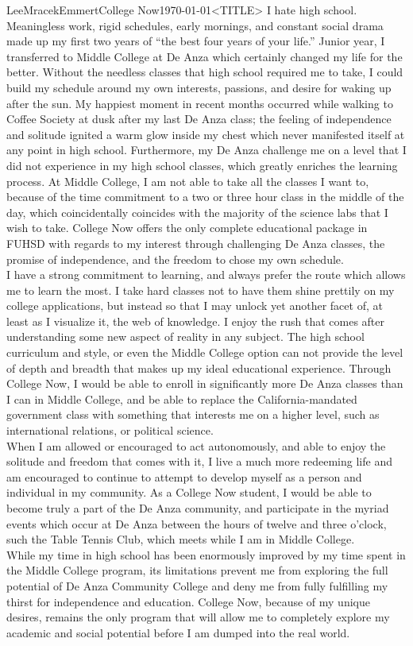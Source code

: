 \documentclass[a4paper]{article}
\begin{document}
\begin{mla}{Lee}{Mracek}{Emmert}{College Now}{\today}{<TITLE>}
    I hate high school. Meaningless work, rigid schedules, early mornings, and constant social drama made up my first two years of ``the best four years of your life.'' Junior year, I transferred to Middle College at De Anza which certainly changed my life for the better. Without the needless classes that high school required me to take, I could build my schedule around my own interests, passions, and desire for waking up after the sun. My happiest moment in recent months occurred while walking to Coffee Society at dusk after my last De Anza class; the feeling of independence and solitude ignited a warm glow inside my chest which never manifested itself at any point in high school. Furthermore, my De Anza challenge me on a level that I did not experience in my high school classes, which greatly enriches the learning process. At Middle College, I am not able to take all the classes I want to, because of the time commitment to a two or three hour class in the middle of the day, which coincidentally coincides with the majority of the science labs that I wish to take. College Now offers the only complete educational package in FUHSD with regards to my interest through challenging De Anza classes, the promise of independence, and the freedom to chose my own schedule. \\
    I have a strong commitment to learning, and always prefer the route which allows me to learn the most. I take hard classes not to have them shine prettily on my college applications, but instead so that I may unlock yet another facet of, at least as I visualize it, the web of knowledge. I enjoy the rush that comes after understanding some new aspect of reality in any subject. The high school curriculum and style, or even the Middle College option can not provide the level of depth and breadth that makes up my ideal educational experience. Through College Now, I would be able to enroll in significantly more De Anza classes than I can in Middle College, and be able to replace the California-mandated government class with something that interests me on a higher level, such as international relations, or political science. \\
    When I am allowed or encouraged to act autonomously, and able to enjoy the solitude and freedom that comes with it, I live a much more redeeming life and am encouraged to continue to attempt to develop myself as a person and individual in my community. As a College Now student, I would be able to become truly a part of the De Anza community, and participate in the myriad events which occur at De Anza between the hours of twelve and three o'clock, such the Table Tennis Club, which meets while I am in Middle College. \\
    While my time in high school has been enormously improved by my time spent in the Middle College program, its limitations prevent me from exploring the full potential of De Anza Community College and deny me from fully fulfilling my thirst for independence and education. College Now, because of my unique desires, remains the only program that will allow me to completely explore my academic and social potential before I am dumped into the real world.
\end{mla}
\end{document}
